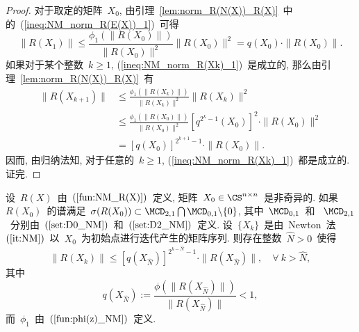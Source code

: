 \begin{proof}

对于取定的矩阵~$X_0$,
由引理~\ref{lem:norm_R(N(X))_R(X)}~中的~(\ref{ineq:NM_norm_R(E(X))_1})~可得
$$
\|R(X_1)\| \leq \frac{\phi_1(\|R(X_0)\|)}{\|R(X_0)\|^2} \|R(X_0)\|^2
= q(X_0) \cdot \|R(X_0)\|.
$$
%
如果对于某个整数~$k \geq 1$, (\ref{ineq:NM_norm_R(Xk)_1})~是成立的,
那么由引理~\ref{lem:norm_R(N(X))_R(X)}~有
\begin{align*}
\|R(X_{k+1})\| & \leq
\frac{\phi_1(\|R(X_k)\|)}{\|R(X_k)\|^2}\|R(X_k)\|^2\\
& \leq \frac{\phi_1(\|R(X_0)\|)}{\|R(X_0)\|^2}
\left[q^{2^k-1}(X_0)\right]^2 \cdot \|R(X_0)\|^2\\
& = [q(X_0)]^{2^{k+1}-1}\cdot\|R(X_0)\|.
\end{align*}
%
因而, 由归纳法知, 对于任意的~$k \geq 1$,
(\ref{ineq:NM_norm_R(Xk)_1})~都是成立的. 证完.
\end{proof}



\begin{lemma}
\label{lem:NM_R(X)_convergence2} %
%
设~$R(X)$~由~$(\ref{fun:NM_R(X)})$~定义, 矩阵~$X_0 \in \CS^{n \times
n}$~是非奇异的. 如果~$R(X_0)$~的谱满足~$\sigma(R(X_0)) \subset
\MCD_{2,1} \bigcap \MCD_{0,1}\backslash\{0\}$, 其中~$\MCD_{0,1}$~和
~$\MCD_{2,1}$~分别由~$(\ref{set:D0_NM})$~和~$(\ref{set:D2_NM})$~定义.
设~$\{X_k\}$~是由~Newton~法~$(\ref{it:NM})$~以~$X_0$~为初始点进行迭代产生的矩阵序列.
则存在整数~$\widehat{N} > 0$~使得
\begin{equation}
\label{ineq:NM_norm_R(Xk)_2} \|R(X_k)\| \leq
[q(X_{\widehat{N}})]^{2^{k-\widehat{N}}-1} \cdot
\|R(X_{\widehat{N}})\|, \quad \forall \ k
> \widehat{N},
\end{equation}
%
其中
\begin{equation*}
q(X_{\widehat{N}}) :=
\frac{\phi(\|R(X_{\widehat{N}})\|)}{\|R(X_{\widehat{N}})\|} < 1,
\end{equation*}
而~$\phi_1$~由~$(\ref{fun:phi(z)_NM})$~定义.
\end{lemma}

